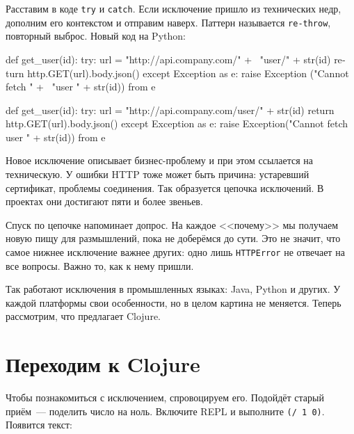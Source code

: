 Расставим в коде \verb|try| и \verb|catch|. Если исключение пришло из
технических недр, дополним его контекстом и отправим наверх. Паттерн называется
\verb|re-throw|, повторный выброс. Новый код на Python:

\ifx\DEVICETYPE\MOBILE

\begin{english}
  \begin{python}
def get_user(id):
  try:
    url = "http://api.company.com/" + \
          "user/" + str(id)
    return http.GET(url).body.json()
  except Exception as e:
    raise Exception ("Cannot fetch " + \
          "user " + str(id)) from e
  \end{python}
\end{english}

\else

\begin{english}
  \begin{js}
def get_user(id):
  try:
    url = "http://api.company.com/user/" + str(id)
    return http.GET(url).body.json()
  except Exception as e:
    raise Exception("Cannot fetch user " + str(id)) from e

  \end{js}
\end{english}

\fi


Новое исключение описывает бизнес-проб\-ле\-му и при этом ссылается на
техническую. У ошибки HTTP тоже может быть причина: устаревший сертификат,
проблемы соединения. Так образуется цепочка исключений. В проектах они достигают
пяти и более звеньев.

Спуск по цепочке напоминает допрос. На каждое <<почему>> мы получаем новую пищу
для размышлений, пока не доберёмся до сути. Это не значит, что самое нижнее
исключение важнее других: одно лишь \verb|HTTPError| не отвечает на все
вопросы. Важно то, как к нему пришли.

Так работают исключения в промышленных языках: Java, Python и других. У каждой
платформы свои особенности, но в целом картина не меняется. Теперь рассмотрим,
что предлагает Clojure.

\section{Переходим к Clojure}

Чтобы познакомиться с исключением, спровоцируем его. Подойдёт старый
приём~--- поделить число на ноль. Включите REPL и выполните
\verb|(/ 1 0)|. Появится текст:


